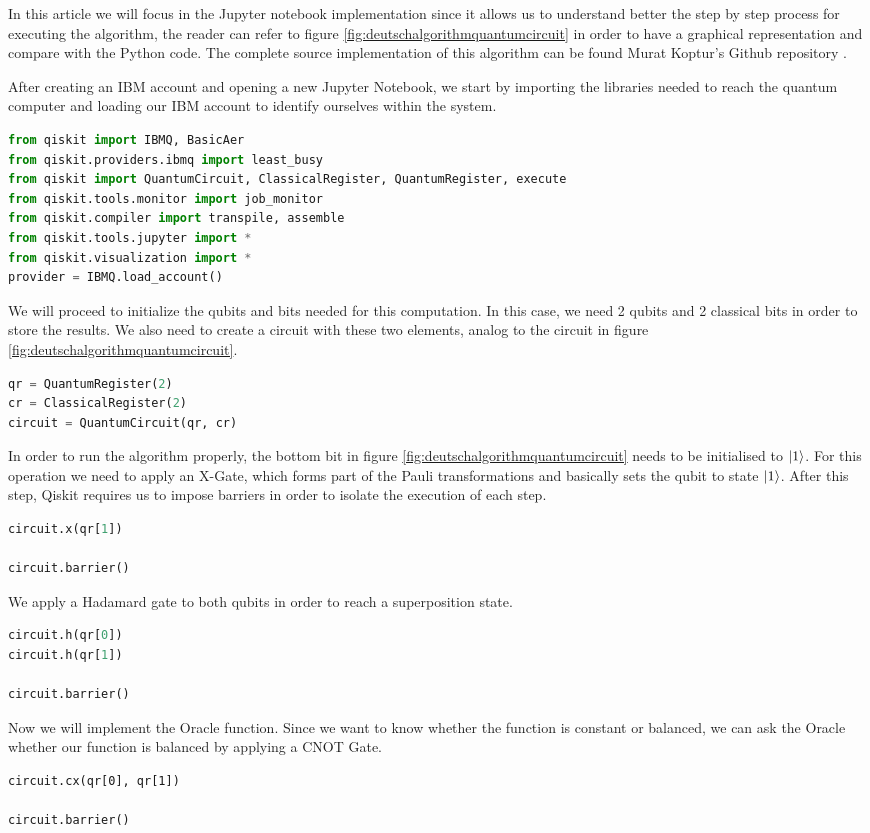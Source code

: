 \documentclass[12pt,a4paper]{scrartcl}
\begin{document}
In this article we will focus in the Jupyter notebook implementation since it allows us to understand better the step by step process for executing the algorithm, the reader can refer to figure \ref{fig:deutschalgorithmquantumcircuit} in order to have a graphical representation and compare with the Python code. The complete source implementation of this algorithm can be found Murat Koptur's Github repository \cite{kopturgithub}.

After creating an IBM account and opening a new Jupyter Notebook, we start by importing the libraries needed to reach the quantum computer and loading our IBM account to identify ourselves within the system.

\begin{lstlisting}[language=python]
from qiskit import IBMQ, BasicAer
from qiskit.providers.ibmq import least_busy
from qiskit import QuantumCircuit, ClassicalRegister, QuantumRegister, execute
from qiskit.tools.monitor import job_monitor
from qiskit.compiler import transpile, assemble
from qiskit.tools.jupyter import *
from qiskit.visualization import *
provider = IBMQ.load_account()
\end{lstlisting}

We will proceed to initialize the qubits and bits needed for this computation. In this case, we need 2 qubits and 2 classical bits in order to store the results. We also need to create a circuit with these two elements, analog to the circuit in figure \ref{fig:deutschalgorithmquantumcircuit}.

\begin{lstlisting}[language=python]
qr = QuantumRegister(2)  
cr = ClassicalRegister(2) 
circuit = QuantumCircuit(qr, cr)
\end{lstlisting}

In order to run the algorithm properly, the bottom bit in figure \ref{fig:deutschalgorithmquantumcircuit} needs to be initialised to $\ket{1}$. For this operation we need to apply an X-Gate, which forms part of the Pauli transformations and basically sets the qubit to state $\ket{1}$. After this step, Qiskit requires us to impose barriers in order to isolate the execution of each step.

\begin{lstlisting}[language=python]
circuit.x(qr[1]) 

circuit.barrier()
\end{lstlisting}
We apply a Hadamard gate to both qubits in order to reach a superposition state.
\begin{lstlisting}[language=python]
circuit.h(qr[0])
circuit.h(qr[1])

circuit.barrier()
\end{lstlisting}
Now we will implement the Oracle function. Since we want to know whether the function is constant or balanced, we can ask the Oracle whether our function is balanced by applying a CNOT Gate. 
\begin{lstlisting}
circuit.cx(qr[0], qr[1])

circuit.barrier()
\end{lstlisting}
\end{document}
